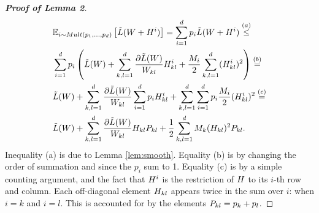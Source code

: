 \documentclass{article}
\begin{document}
%
\begin{proof}[\bf{Proof of Lemma 2}]
\begin{align*}
&\mathbb{E}_{i \sim Mult(p_1, \ldots, p_d)} \left[ \tilde{L}({W} + {H}^i) \right] =\sum_{i=1}^d p_i \tilde{L}({W} + {H}^i) \stackrel{(a)}{\leq} \\
& \sum_{i=1}^d p_i \left(\tilde{L}({W}) + \sum_{k,l=1}^d \frac{\partial \tilde{L}({W})}{{W}_{kl}} {H}_{kl}^i + \frac{M_i}{2} \sum_{k,l=1}^d  ({H}_{kl}^i)^2 \right) \stackrel{(b)}{=} \\
& \tilde{L}({W}) + \sum_{k,l=1}^d \frac{\partial \tilde{L}({W})}{{W}_{kl}} \sum_{i=1}^d  p_i {H}_{kl}^i + \sum_{k,l=1}^d  \sum_{i=1}^d  p_i \frac{M_i}{2} ({H}_{kl}^i)^2  \stackrel{(c)}{=} \\
& \tilde{L}({W}) + \sum_{k,l=1}^d \frac{\partial \tilde{L}({W})}{{W}_{kl}} {H}_{kl} {P}_{kl} + \frac{1}{2} \sum_{k,l=1}^d M_k ({H}_{kl})^2 {P}_{kl}.
\end{align*}
Inequality (a) is due to Lemma \ref{lem:smooth}. Equality (b) is by changing the order of summation and since the $p_i$ sum to 1. Equality (c) is by a simple counting argument, and the fact that ${H}^i$ is the restriction of ${H}$ to its $i$-th row and column. Each off-diagonal element ${H}_{kl}$ appears twice in the sum over $i$: when $i=k$ and $i=l$. This is accounted for by the elements ${P}_{kl} = p_k + p_l$.
\end{proof}
\end{document}

